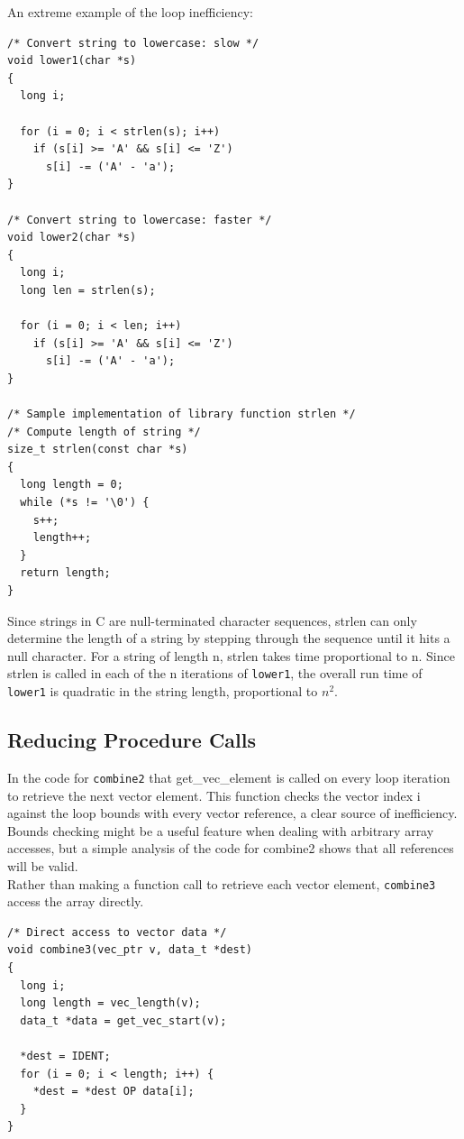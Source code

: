 \documentclass[11pt]{article}
\begin{document}
An extreme example of the loop inefficiency:\\
\begin{verbatim}
/* Convert string to lowercase: slow */
void lower1(char *s)
{
  long i;

  for (i = 0; i < strlen(s); i++)
    if (s[i] >= 'A' && s[i] <= 'Z')
      s[i] -= ('A' - 'a');
}

/* Convert string to lowercase: faster */
void lower2(char *s)
{
  long i;
  long len = strlen(s);

  for (i = 0; i < len; i++)
    if (s[i] >= 'A' && s[i] <= 'Z')
      s[i] -= ('A' - 'a');
}

/* Sample implementation of library function strlen */
/* Compute length of string */
size_t strlen(const char *s)
{
  long length = 0;
  while (*s != '\0') {
    s++;
    length++;
  }
  return length;
}

\end{verbatim}
Since strings in C are null-terminated character sequences, strlen can only determine the length of a string by stepping through the sequence until it hits a null character. For a string of length n, strlen takes time proportional to n. Since strlen is called in each of the n iterations of \texttt{lower1}, the overall run time of \texttt{lower1} is quadratic in the string length, proportional to \(n^2\).\\



\subsection{Reducing Procedure Calls}
\label{sec:org3357f47}
In the code for \texttt{combine2} that get\_vec\_element is called on every loop iteration to retrieve the next vector element. This function checks the vector index i against the loop bounds with every vector reference, a clear source of inefficiency. Bounds checking might be a useful feature when dealing with arbitrary array accesses, but a simple analysis of the code for combine2 shows that all references will be valid.\\

Rather than making a function call to retrieve each vector element, \texttt{combine3} access the array directly.\\
\begin{verbatim}
/* Direct access to vector data */
void combine3(vec_ptr v, data_t *dest)
{
  long i;
  long length = vec_length(v);
  data_t *data = get_vec_start(v);

  *dest = IDENT;
  for (i = 0; i < length; i++) {
    *dest = *dest OP data[i];
  }
}

\end{verbatim}
\end{document}
